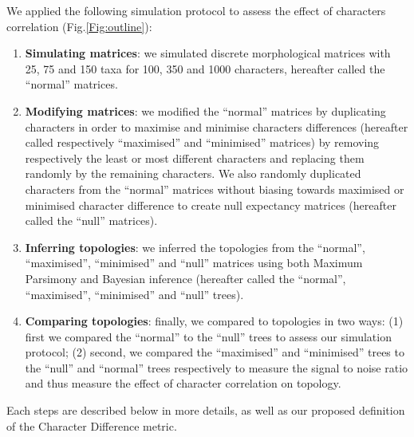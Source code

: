 \documentclass[12pt,letterpaper]{article}
\begin{document}
We applied the following simulation protocol to assess the effect of characters correlation (Fig.\ref{Fig:outline}):
\begin{enumerate}
    \item \textbf{Simulating matrices}: we simulated discrete morphological matrices with 25, 75 and 150 taxa for 100, 350 and 1000 characters, hereafter called the ``normal'' matrices.
    \item \textbf{Modifying matrices}: we modified the ``normal'' matrices by duplicating characters in order to maximise and minimise characters differences (hereafter called respectively ``maximised'' and ``minimised'' matrices) by removing respectively the least or most different characters and replacing them randomly by the remaining characters. We also randomly duplicated characters from the ``normal'' matrices without biasing towards maximised or minimised character difference to create null expectancy matrices (hereafter called the ``null'' matrices).
    \item \textbf{Inferring topologies}: we inferred the topologies from the ``normal'', ``maximised'', ``minimised'' and ``null'' matrices using both Maximum Parsimony and Bayesian inference (hereafter called the ``normal'', ``maximised'', ``minimised'' and ``null'' trees).
    \item \textbf{Comparing topologies}: finally, we compared to topologies in two ways: (1) first we compared the ``normal'' to the ``null'' trees to assess our simulation protocol; (2) second, we compared the ``maximised'' and ``minimised'' trees to the ``null'' and ``normal'' trees respectively to measure the signal to noise ratio and thus measure the effect of character correlation on topology.
\end{enumerate}
Each steps are described below in more details, as well as our proposed definition of the Character Difference metric.
\end{document}
